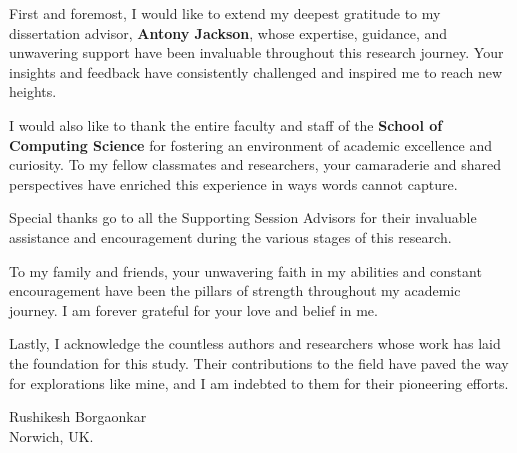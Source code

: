 
\def\baselinestretch{1.0}


First and foremost, I would like to extend my deepest gratitude to my dissertation advisor, \textbf{Antony Jackson}, whose expertise, guidance, and unwavering support have been invaluable throughout this research journey. Your insights and feedback have consistently challenged and inspired me to reach new heights.

\medskip

\noindent
I would also like to thank the entire faculty and staff of the \textbf{School of Computing Science} for fostering an environment of academic excellence and curiosity. To my fellow classmates and researchers, your camaraderie and shared perspectives have enriched this experience in ways words cannot capture.
\medskip

Special thanks go to all the Supporting Session Advisors for their invaluable assistance and encouragement during the various stages of this research.
\medskip

\noindent
To my family and friends, your unwavering faith in my abilities and constant encouragement have been the pillars of strength throughout my academic journey. I am forever grateful for your love and belief in me.

\medskip

Lastly, I acknowledge the countless authors and researchers whose work has laid the foundation for this study. Their contributions to the field have paved the way for explorations like mine, and I am indebted to them for their pioneering efforts.

\bigskip\medskip

\noindent
\vskip0.4in  
\hfill Rushikesh Borgaonkar \\
\vskip0.2in 
\hfill Norwich, UK.\\

